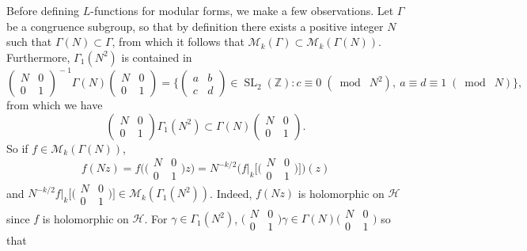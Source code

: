 \documentclass[10pt,leqno,twoside]{article}
\theoremstyle{plain}
\theoremstyle{definition}
\numberwithin{equation}{section}
\numberwithin{lem}{section}
\DeclareMathOperator{\SL}{SL}
\newcommand{\smod}[1]{\;(\bmod\; #1)}
\newcommand{\abcd}{\begin{pmatrix}
    a & b \\ c & d
\end{pmatrix}}
\newcommand{\slz}{\SL_2(\mathbb{Z})}
\begin{document}
Before defining $L$-functions for modular forms, we make a few observations. Let $\varGamma$ be a congruence subgroup, so that by definition there exists a positive integer $N$ such that $\varGamma(N)\subset \varGamma$, from which it follows that $\mathcal M_k(\varGamma)\subset \mathcal M_k(\varGamma(N))$. Furthermore, $\varGamma_1(N^2)$ is contained in 
\[\begin{pmatrix}
    N & 0 \\ 0 & 1
\end{pmatrix}^{\!-1}\varGamma(N)\begin{pmatrix}
    N & 0 \\ 0 & 1
\end{pmatrix} = \Big\{\abcd\in \slz : c\equiv 0 \smod {N^2},~ a\equiv d\equiv 1\smod N\Big\},\] from which we have
\[\begin{pmatrix}
    N & 0 \\ 0 & 1
\end{pmatrix}\varGamma_1(N^2)\subset \varGamma(N)\begin{pmatrix}
    N & 0 \\ 0 & 1
\end{pmatrix}.\] So if $f\in \mathcal M_k(\varGamma(N))$,
\[f(Nz) = f\big(\big(\!\begin{smallmatrix}
    N & 0 \\ 0 & 1
\end{smallmatrix}\!\big)z\big) = N^{-k/2}\Big(f|_k\big[\big(\!\begin{smallmatrix}
    N & 0 \\ 0 & 1
\end{smallmatrix}\!\big)\big]\Big)(z)\] and $N^{-k/2}f|_k\big[\big(\!\begin{smallmatrix}
    N & 0 \\ 0 & 1
\end{smallmatrix}\!\big)\big]\in \mathcal M_k(\varGamma_1(N^2))$. Indeed, $f(Nz)$ is holomorphic on $\mathcal H$ since $f$ is holomorphic on $\mathcal H$. For $\gamma\in\varGamma_1(N^2)$, $\big(\!\begin{smallmatrix}
    N & 0 \\ 0 & 1
\end{smallmatrix}\!\big)\gamma\in \varGamma(N)\big(\!\begin{smallmatrix}
    N & 0 \\ 0 & 1
\end{smallmatrix}\!\big)$ so that
\end{document}
